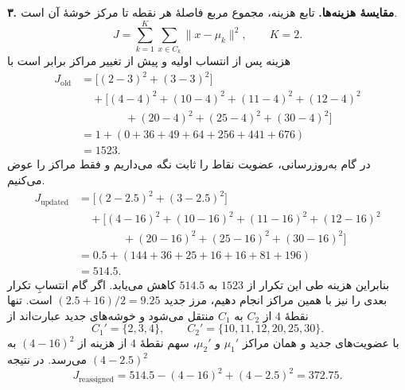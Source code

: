 \documentclass{article}
\numberwithin{equation}{section}
\numberwithin{table}{section}
\begin{document}
\noindent\textbf{۳. مقایسهٔ هزینه‌ها.}
تابع هزینه، مجموع مربع فاصلهٔ هر نقطه تا مرکز خوشهٔ آن است.
\[
    J=\sum_{k=1}^{K}\sum_{x\in C_k}\lVert x-\mu_k\rVert^2,
    \qquad K=2.
\]
هزینه پس از انتساب اولیه و پیش از تغییر مراکز برابر است با
\begin{align*}
    J_{\mathrm{old}}
    &=\bigl[(2-3)^2+(3-3)^2\bigr]\\
    &\quad+\bigl[(4-4)^2+(10-4)^2+(11-4)^2+(12-4)^2\\
    &\hspace{4em}+(20-4)^2+(25-4)^2+(30-4)^2\bigr]\\
    &=1+(0+36+49+64+256+441+676)\\
    &=1523.
\end{align*}
در گام به‌روزرسانی، عضویت نقاط را ثابت نگه می‌داریم و فقط مراکز را عوض می‌کنیم.
\begin{align*}
    J_{\mathrm{updated}}
    &=\bigl[(2-2.5)^2+(3-2.5)^2\bigr]\\
    &\quad+\bigl[(4-16)^2+(10-16)^2+(11-16)^2+(12-16)^2\\
    &\hspace{4em}+(20-16)^2+(25-16)^2+(30-16)^2\bigr]\\
    &=0.5+(144+36+25+16+16+81+196)\\
    &=514.5.
\end{align*}
بنابراین هزینه طی این تکرار از \(1523\) به \(514.5\) کاهش می‌یابد. اگر گام انتسابِ تکرار بعدی را نیز با همین مراکز انجام دهیم، مرز جدید \((2.5+16)/2=9.25\) است. تنها نقطهٔ \(4\) از \(C_2\) به \(C_1\) منتقل می‌شود و خوشه‌های جدید عبارت‌اند از
\[
    C_1'=\{2,3,4\},\qquad C_2'=\{10,11,12,20,25,30\}.
\]
با عضویت‌های جدید و همان مراکز \(\mu_1'\) و \(\mu_2'\)، سهم نقطهٔ \(4\) از هزینه از \((4-16)^2\) به \((4-2.5)^2\) می‌رسد. در نتیجه
\[
    J_{\mathrm{reassigned}}=514.5-(4-16)^2+(4-2.5)^2=372.75.
\]
\\
\end{document}
